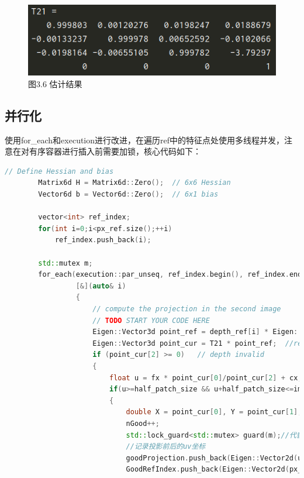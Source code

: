 \documentclass[40pt,a4paper，UTF8]{ctexart}
\numberwithin{equation}{section}
\begin{document}
\begin{figure}[H]
\centering
\includegraphics[width=4.8in]{ch6_3_3.png} {图3.6 估计结果}
\end{figure}

\subsection{并行化}
使用for\_each和execution进行改进，在遍历ref中的特征点处使用多线程并发，注意在对有序容器进行插入前需要加锁，核心代码如下：

\begin{lstlisting}[language=C++, caption=DirectPoseEstimationMultiLayer函数]
        // Define Hessian and bias
        Matrix6d H = Matrix6d::Zero();  // 6x6 Hessian
        Vector6d b = Vector6d::Zero();  // 6x1 bias

        vector<int> ref_index;
        for(int i=0;i<px_ref.size();++i)
            ref_index.push_back(i);

        std::mutex m;
        for_each(execution::par_unseq, ref_index.begin(), ref_index.end(),
                 [&](auto& i)
                 {
                     // compute the projection in the second image
                     // TODO START YOUR CODE HERE
                     Eigen::Vector3d point_ref = depth_ref[i] * Eigen::Vector3d((px_ref[i][0]-cx)/fx, (px_ref[i][1]-cy)/fy, 1);  //ref中的3D点坐标
                     Eigen::Vector3d point_cur = T21 * point_ref;  //ref中的3D点转换到cur中的3D点
                     if (point_cur[2] >= 0)   // depth invalid
                     {
                         float u = fx * point_cur[0]/point_cur[2] + cx, v = fy * point_cur[1]/point_cur[2] + cy;
                         if(u>=half_patch_size && u+half_patch_size<=img2.cols && v>=half_patch_size && v+half_patch_size<=img2.rows)  //变换到cur中若越界则不优化
                         {
                             double X = point_cur[0], Y = point_cur[1], Z = point_cur[2], inv_z = 1.0 / Z, inv_z2 = inv_z * inv_z;  //cur中的3D坐标X'Y'Z'
                             nGood++;
                             std::lock_guard<std::mutex> guard(m);//代替m.lock; m.unlock();
                             //记录投影前后的uv坐标
                             goodProjection.push_back(Eigen::Vector2d(u, v));
                             GoodRefIndex.push_back(Eigen::Vector2d(px_ref[i][0],px_ref[i][1]));
\end{lstlisting}
\end{document}
